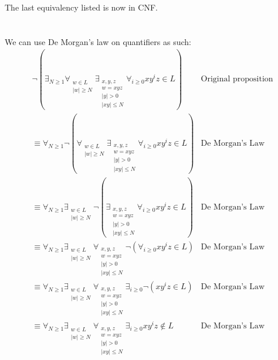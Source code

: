 \documentclass[draft]{article}
\begin{document}
The last equivalency listed is now in CNF.

\section{}
We can use De Morgan's law on quantifiers as such:
\begin{align*}
    & \neg( \mathop{\exists}_{N \geq 1} 
        \mathop{\forall}_{\substack{w \in L \\ |w| \geq N}} 
        \mathop{\exists}_{\substack{x,y,z \\ w = xyz \\ |y|>0 \\ |xy| \leq N}}
        \mathop{\forall}_{i \geq 0 }
        xy^i z \in L) & \text{Original proposition} & \\
    & \equiv \mathop{\forall}_{N \geq 1} 
        \neg( \mathop{\forall}_{\substack{w \in L \\ |w| \geq N}} 
        \mathop{\exists}_{\substack{x,y,z \\ w = xyz \\ |y|>0 \\ |xy| \leq N}}
        \mathop{\forall}_{i \geq 0 }
        xy^i z \in L) & \text{De Morgan's Law} &\\
    & \equiv \mathop{\forall}_{N \geq 1} 
        \mathop{\exists}_{\substack{w \in L \\ |w| \geq N}} 
        \neg (\mathop{\exists}_{\substack{x,y,z \\ w = xyz \\ |y|>0 \\ |xy| \leq N}}
        \mathop{\forall}_{i \geq 0 }
        xy^i z \in L) & \text{De Morgan's Law} &\\
    & \equiv \mathop{\forall}_{N \geq 1} 
        \mathop{\exists}_{\substack{w \in L \\ |w| \geq N}} 
        \mathop{\forall}_{\substack{x,y,z \\ w = xyz \\ |y|>0 \\ |xy| \leq N}}
        \neg (\mathop{\forall}_{i \geq 0 }
        xy^i z \in L) & \text{De Morgan's Law} &\\
    & \equiv \mathop{\forall}_{N \geq 1} 
        \mathop{\exists}_{\substack{w \in L \\ |w| \geq N}} 
        \mathop{\forall}_{\substack{x,y,z \\ w = xyz \\ |y|>0 \\ |xy| \leq N}}
        \mathop{\exists}_{i \geq 0 }
        \neg (xy^i z \in L) & \text{De Morgan's Law} &\\
    & \equiv \mathop{\forall}_{N \geq 1} 
        \mathop{\exists}_{\substack{w \in L \\ |w| \geq N}} 
        \mathop{\forall}_{\substack{x,y,z \\ w = xyz \\ |y|>0 \\ |xy| \leq N}}
        \mathop{\exists}_{i \geq 0 }
        xy^i z \notin L & \text{De Morgan's Law} &\\
\end{align*}
\end{document}
